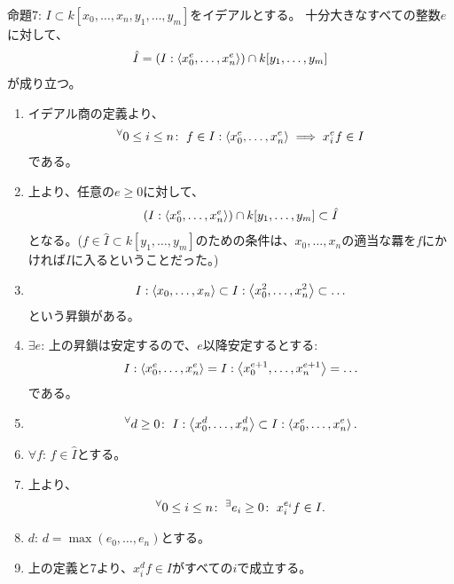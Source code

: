 \begin{framed}
  命題7:
  $I\subset k[x_0,\dots,x_n,y_1,\dots,y_m]$をイデアルとする。
  十分大きなすべての整数$e$に対して、
  \begin{align}
    \hat I = (I: \left\langle x_0^e,\dots,x_n^e \right\rangle)\cap k[y_1,\dots,y_m]
  \end{align}
  が成り立つ。
\end{framed}
\begin{myproof}
  \begin{enumerate}
    \item イデアル商の定義より、
    \begin{align}
      {}^{\forall}{0\le i \le n}\mathrm{\colon\;}
      f\in I:\left\langle x_0^e,\dots,x_n^e \right\rangle
      \implies
      x_i^e f \in I
    \end{align}
    である。
    \item
    上より、任意の$e\ge 0$に対して、
    \begin{align}
      (I:\left\langle x_0^e,\dots,x_n^e \right\rangle) \cap k[y_1,\dots,y_m] \subset \hat I
    \end{align}
    となる。($f\in \hat I \subset k[y_1,\dots,y_m]$のための条件は、$x_0,\dots,x_n$の適当な羃を$f$にかければ$I$に入るということだった。)
    \item
    \begin{align}
      I:\left\langle x_0,\dots,x_n \right\rangle
      \subset
      I:\left\langle x_0^2,\dots,x_n^2 \right\rangle
      \subset
      \dots
    \end{align}
    という昇鎖がある。
    \item $\exists e$:
    上の昇鎖は安定するので、$e$以降安定するとする:
    \begin{align}
      I:\left\langle x_0^e,\dots,x_n^e \right\rangle
      =
      I:\left\langle x_0^{e+1},\dots,x_n^{e+1} \right\rangle=\dots
    \end{align}
    である。
    \item
    \begin{align}
      {}^{\forall}{d\ge 0}\mathrm{\colon\;} I:\left\langle x_0^d,\dots,x_n^d \right\rangle
      \subset
      I:\left\langle x_0^e,\dots,x_n^e \right\rangle.
    \end{align}
    \item $\forall f$:
    $f\in \hat I$とする。
    \item
    上より、
    \begin{align}
      {}^{\forall}{0\le i\le n}\mathrm{\colon\;}{}^{\exists}{e_i\ge 0}\mathrm{\colon\;}x_i^{e_i} f \in I.
    \end{align}
    \item $d$:
    $d = \max(e_0,\dots,e_n)$とする。
    \item
    上の定義と7より、$x_i^d f \in I$がすべての$i$で成立する。

\end{enumerate}
\end{myproof}
